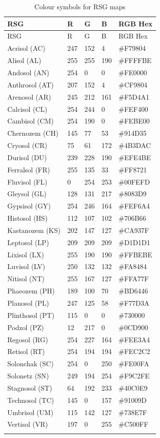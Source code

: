 \documentclass[
  letterpaper,
  DIV=11,
  numbers=noendperiod]{scrreprt}
\begin{document}
\begin{longtable}[]{@{}lllll@{}}
\caption{Colour symbols for RSG maps}\tabularnewline
\toprule()
RSG & R & G & B & RGB Hex \\
\midrule()
\endfirsthead
\toprule()
RSG & R & G & B & RGB Hex \\
\midrule()
\endhead
Acrisol (AC) & 247 & 152 & 4 & \#F79804 \\
Alisol (AL) & 255 & 255 & 190 & \#FFFFBE \\
Andosol (AN) & 254 & 0 & 0 & \#FE0000 \\
Anthrosol (AT) & 207 & 152 & 4 & \#CF9804 \\
Arenosol (AR) & 245 & 212 & 161 & \#F5D4A1 \\
Calcisol (CL) & 254 & 244 & 0 & \#FEF400 \\
Cambisol (CM) & 254 & 190 & 0 & \#FEBE00 \\
Chernozem (CH) & 145 & 77 & 53 & \#914D35 \\
Cryosol (CR) & 75 & 61 & 172 & \#4B3DAC \\
Durisol (DU) & 239 & 228 & 190 & \#EFE4BE \\
Ferralsol (FR) & 255 & 135 & 33 & \#FF8721 \\
Fluvisol (FL) & 0 & 254 & 253 & \#00FEFD \\
Gleysol (GL) & 128 & 131 & 217 & \#8083D9 \\
Gypsisol (GY) & 254 & 246 & 164 & \#FEF6A4 \\
Histosol (HS) & 112 & 107 & 102 & \#706B66 \\
Kastanozem (KS) & 202 & 147 & 127 & \#CA937F \\
Leptosol (LP) & 209 & 209 & 209 & \#D1D1D1 \\
Lixisol (LX) & 255 & 190 & 190 & \#FFBEBE \\
Luvisol (LV) & 250 & 132 & 132 & \#FA8484 \\
Nitisol (NT) & 255 & 167 & 127 & \#FFA77F \\
Phaeozem (PH) & 189 & 100 & 70 & \#BD6446 \\
Planosol (PL) & 247 & 125 & 58 & \#F77D3A \\
Plinthosol (PT) & 115 & 0 & 0 & \#730000 \\
Podzol (PZ) & 12 & 217 & 0 & \#0CD900 \\
Regosol (RG) & 254 & 227 & 164 & \#FEE3A4 \\
Retisol (RT) & 254 & 194 & 194 & \#FEC2C2 \\
Solonchak (SC) & 254 & 0 & 250 & \#FE00FA \\
Solonetz (SN) & 249 & 194 & 254 & \#F9C2FE \\
Stagnosol (ST) & 64 & 192 & 233 & \#40C0E9 \\
Technosol (TC) & 145 & 0 & 157 & \#91009D \\
Umbrisol (UM) & 115 & 142 & 127 & \#738E7F \\
Vertisol (VR) & 197 & 0 & 255 & \#C500FF \\
& & & & \\
\bottomrule()
\end{longtable}
\end{document}
